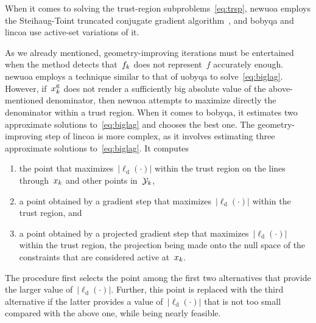 \documentclass[11pt,draft]{article}
\numberwithin{equation}{section}
\newcommand{\abs}[2][]{#1\lvert#2#1\rvert}
\newcommand{\drop}{{\text{d}}}
\newcommand{\geo}{{\text{g}}}
\newcommand{\iter}[1][k]{x\ifthenelse{\equal{#1}{}}{}{_{#1}}}
\newcommand{\obj}{f}
\newcommand{\objm}[1][k]{\obj\ifthenelse{\equal{#1}{}}{}{_{#1}}}
\newcommand{\xpt}[1][k]{\mathcal{Y}\ifthenelse{\equal{#1}{}}{}{_{#1}}}
\begin{document}
When it comes to solving the trust-region subproblems~\cref{eq:trsp}, \gls{newuoa} employs the Steihaug-Toint truncated conjugate gradient algorithm~\cite{Steihaug_1983, Toint_1981}, and \gls{bobyqa} and \gls{lincoa} use active-set variations of it.

As we already mentioned, geometry-improving iterations must be entertained when the method detects that~$\objm$ does not represent~$\obj$ accurately enough.
\Gls{newuoa} employs a technique similar to that of \gls{uobyqa} to solve~\cref{eq:biglag}.
However, if~$\iter^{\geo}$ does not render a sufficiently big absolute value of the above-mentioned denominator, then \gls{newuoa} attempts to maximize directly the denominator within a trust region.
When it comes to \gls{bobyqa}, it estimates two approximate solutions to~\cref{eq:biglag} and chooses the best one.
The geometry-improving step of \gls{lincoa} is more complex, as it involves estimating three approximate solutions to~\cref{eq:biglag}.
It computes
\begin{enumerate}
    \item the point that maximizes~$\abs{\ell_{\drop}(\cdot)}$ within the trust region on the lines through~$\iter$ and other points in~$\xpt$,
    \item a point obtained by a gradient step that maximizes~$\abs{\ell_{\drop}(\cdot)}$ within the trust region, and
    \item a point obtained by a projected gradient step that maximizes~$\abs{\ell_{\drop}(\cdot)}$ within the trust region, the projection being made onto the null space of the constraints that are considered active at~$\iter$.
\end{enumerate}
The procedure first selects the point among the first two alternatives that provide the larger value of~$\abs{\ell_{\drop}(\cdot)}$.
Further, this point is replaced with the third alternative if the latter provides a value of~$\abs{\ell_{\drop}(\cdot)}$ that is not too small compared with the above one, while being nearly feasible.
\end{document}
